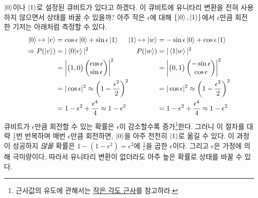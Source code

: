 \documentclass[a4paper,chapter,atbegshi]{oblivoir}
\begin{document}
$\ket0$이나 $\ket1$로 설정된 큐비트가 있다고 하겠다. 이 큐비트에 유니타리
변환을 전혀 사용하지 않으면서 상태를 바꿀 수 있을까? 아주 작은 $\epsilon$에 
대해 $\{\ket0,\ket1\}$에서 $\epsilon$만큼 회전한 기저는 아래처럼 측정할 수 있다.
\begin{align*}
  \begin{aligned}
  \ket0\mapsto\ket{v}&= \cos\epsilon\ket0+\sin\epsilon\ket1\\
  \Rightarrow 
    P(\ket{v})&=|\braket{0|v}|^2 \\
              &=\left|\begin{pmatrix}1,0\end{pmatrix}
              \begin{pmatrix}\cos\epsilon\\\sin\epsilon\end{pmatrix}\right|^2 \\
              &=|\cos\epsilon|^2 \approx{\biggl(1-\frac{\epsilon^2}{2}\biggr)^2}\\
              &= 1-\epsilon^2+\frac{\epsilon^4}{4}
              \approx 1-\epsilon^2 \\
  \end{aligned}
  \begin{aligned}
  \ket1\mapsto\ket{w}&=-\sin\epsilon\ket0+\cos\epsilon\ket1\\
    P(\ket w)&=|\braket{1|w}|^2 \\
              &=\left|\begin{pmatrix}0,1\end{pmatrix}
              \begin{pmatrix}-\sin\epsilon\\\cos\epsilon\end{pmatrix}\right|^2\\
              &=|\cos\epsilon|^2 \approx \biggl(1-\frac{\epsilon^2}{2}\biggr)^2\\
              &= 1-\epsilon^2+\frac{\epsilon^4}{4}
              \approx1-\epsilon^2
  \end{aligned}
\end{align*}
큐비트가 $\epsilon$만큼 회전할 수 있는 확률은 $\epsilon$이 감소할수록 
증가\footnote{근사값의 유도에 관해서는 \href{https://en.wikipedia.org/wiki/Small-angle_approximation}{작은 각도 근사}를 참고하라.}한다.
그러니 이 절차를 대략 $\frac{1}{\epsilon}$번 반복하며 매번 $\epsilon$만큼 
회전하면, $\ket0$을 아주 천천히 $\ket1$로 옮길 수 있다. 이 과정이
성공하지 \emph{않을} 확률은 $1-(1-\epsilon^2)=\epsilon^2$에 $\frac{1}{\epsilon}$을
곱한 $\epsilon$이다. 그리고 $\epsilon$은 가정에 의해 극미량이다.
따라서 유니타리 변환이 없더라도 아주 높은 확률로 상태를 바꿀 수 있다. 
\end{document}

